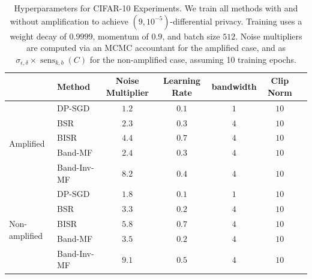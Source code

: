 \documentclass{article} %
\newcommand{\senskb}{\operatorname{sens}_{k, b}}
\begin{document}
\begin{table}[t]
\caption{Hyperparameters for CIFAR-10 Experiments. We train all methods with and without amplification to achieve \((9, 10^{-5})\)-differential privacy. Training uses a weight decay of \(0.9999\), momentum of \(0.9\), and batch size \(512\). Noise multipliers are computed via an MCMC accountant for the amplified case, and as \(\sigma_{\epsilon, \delta} \times \senskb(C)\) for the non-amplified case, assuming 10 training epochs.}

\centering
\renewcommand{\arraystretch}{1} %
\setlength{\tabcolsep}{4pt}      %
\begin{tabular}{llccccc}
\toprule
 & \textbf{Method} & \textbf{Noise Multiplier} & \textbf{Learning Rate}   & \textbf{bandwidth} & \textbf{Clip Norm}\\ 
\midrule
\multirow{5}{*}{Amplified} &   
DP-SGD & $1.2$ & $0.1$ & $1$  & $10$ \\ 
  & BSR& $2.3$ & $0.3$ & $4$ & $10$ \\ 
 & BISR & $4.4$ & $0.7$ & $4$ & $10$ \\ 
 & Band-MF&  $2.4$ & $0.3$ & $4$ & $10$\\
 & Band-Inv-MF& $8.2$ & $0.4$ & $4$ & $10$ \\
\midrule
\multirow{5}{*}{Non-amplified} &  
DP-SGD & $1.8$ & $0.1$ & $1$  & $10$ \\ 
  & BSR& $3.3$ & $0.2$ & $4$ & $10$ \\ 
 & BISR & $5.8$ & $0.7$ & $4$ & $10$ \\ 
 & Band-MF&  $3.5$ & $0.2$ & $4$ & $10$\\
 & Band-Inv-MF& $9.1$ & $0.5$ & $4$ & $10$ \\

\bottomrule
\end{tabular}
\label{tab:hyperparameters}
\end{table}
\end{document}

